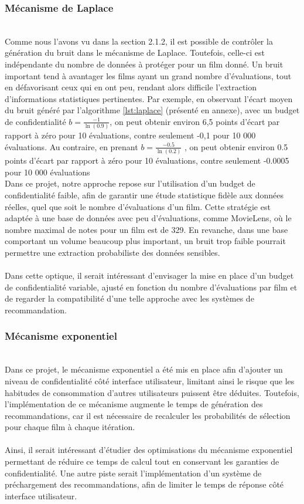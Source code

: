 \documentclass{article}
\begin{document}
    \subsubsection{Mécanisme de Laplace}
    $ $\\
    Comme nous l’avons vu dans la section 2.1.2, il est possible de contrôler la génération du bruit dans le mécanisme de Laplace. 
    Toutefois, celle-ci est indépendante du nombre de données à protéger pour un film donné. Un bruit important tend à avantager les 
    films ayant un grand nombre d’évaluations, tout en défavorisant ceux qui en ont peu, rendant alors difficile l’extraction d’informations 
    statistiques pertinentes. Par exemple, en observant l’écart moyen du bruit généré par l’algorithme \ref{lst:laplace} (présenté en annexe), 
    avec un budget de confidentialité $b= \frac{-1}{\ln(0.9)}$, on peut obtenir environ 6,5 points d’écart par rapport à zéro pour 10 
    évaluations, contre seulement -0,1 pour 10 000 évaluations. Au contraire, en prenant $b= \frac{-0.5}{\ln(0.2)}$ , on peut obtenir environ 
    0.5 points d’écart par rapport à zéro pour 10 évaluations, contre seulement -0.0005 pour 10 000 évaluations\\
    Dans ce projet, notre approche repose sur l’utilisation d’un budget de confidentialité faible, afin de garantir une étude statistique 
    fidèle aux données réelles, quel que soit le nombre d’évaluations d’un film. Cette stratégie est adaptée à une base de données avec 
    peu d’évaluations, comme MovieLens, où le nombre maximal de notes pour un film est de 329. En revanche, dans une base comportant un volume 
    beaucoup plus important, un bruit trop faible pourrait permettre une extraction probabiliste des données sensibles.\\
    \\
    Dans cette optique, il serait intéressant d’envisager la mise en place d’un budget de confidentialité variable, ajusté en fonction du nombre d’évaluations 
    par film et de regarder la compatibilité d'une telle approche avec les systèmes de recommandation.
    \subsubsection{Mécanisme exponentiel}
    $ $\\
    Dans ce projet, le mécanisme exponentiel a été mis en place afin d’ajouter un niveau de confidentialité côté interface utilisateur, limitant 
    ainsi le risque que les habitudes de consommation d'autres utilisateurs puissent être déduites. Toutefois, l’implémentation de ce mécanisme 
    augmente le temps de génération des recommandations, car il est nécessaire de recalculer les probabilités de sélection pour chaque film à chaque itération.\\
    \\
    Ainsi, il serait intéressant d’étudier des optimisations du mécanisme exponentiel permettant de réduire ce temps de calcul tout en conservant les garanties 
    de confidentialité. Une autre piste serait l’implémentation d’un système de préchargement des recommandations, afin de limiter le temps de réponse côté interface utilisateur.
   
\end{document}
